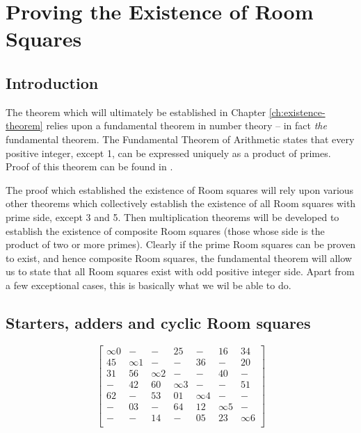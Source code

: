 \chapter{Proving the Existence of Room Squares}
\label{ch:existence-proof}

\section{Introduction}

The theorem which will ultimately be established in Chapter \ref{ch:existence-theorem} relies upon a fundamental theorem in number theory – in fact \emph{the} fundamental theorem.
The Fundamental Theorem of Arithmetic states that every positive integer, except 1, can be expressed uniquely as a product of primes.
Proof of this theorem can be found in
\cite{hardyIntroductionTheoryNumbers1979}.

The proof which established the existence of Room squares will rely upon various other theorems which collectively establish the existence of all Room squares with prime side, except 3 and 5.
Then multiplication theorems will be developed to establish the existence of composite Room squares (those whose side is the product of two or more primes).
Clearly if the prime Room squares can be proven to exist, and hence composite Room squares, the fundamental theorem will allow us to state that all Room squares exist with odd positive integer side.
Apart from a few exceptional cases, this is basically what we wil be able to do.

\section{Starters, adders and cyclic Room squares}

\begin{equation}
  \begin{bmatrix}
    \infty 0 &     -    &     -    &     25     &     -    &     16     &    34    \\
      45     & \infty 1 &     -    &      -     &    36    &      -     &    20    \\
      31     &    56    & \infty 2 &      -     &     -    &     40     &     -    \\
       -     &    42    &    60    &  \infty 3  &     -    &      -     &    51    \\
      62     &     -    &    53    &     01     & \infty 4 &      -     &     -    \\
       -     &    03    &     -    &     64     &    12    &  \infty 5  &     -    \\
       -     &     -    &    14    &      -     &    05    &     23     & \infty 6 \\
  \end{bmatrix}
  \label{eq:cyclic}
\end{equation}

